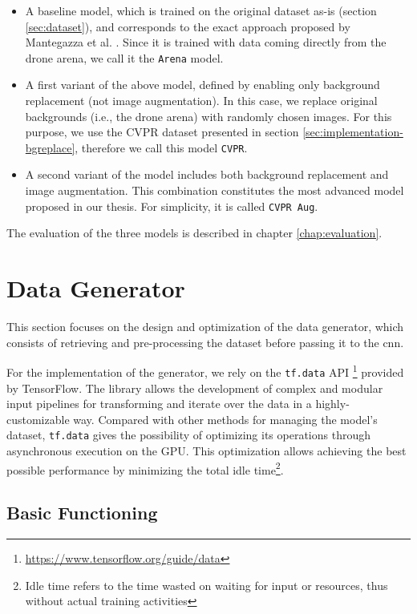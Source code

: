 \begin{itemize}
    \item A baseline model, which is trained on the original dataset as-is (section \ref{sec:dataset}), and corresponds to the exact approach proposed by Mantegazza et al. \cite{mantegazza2019visionbased}. Since it is trained with data coming directly from the drone arena, we call it the \texttt{Arena} model.
    \item A first variant of the above model, defined by enabling only background replacement (not image augmentation). In this case, we replace original backgrounds (i.e., the drone arena) with randomly chosen images. For this purpose, we use the CVPR dataset presented in section \ref{sec:implementation-bgreplace}, therefore we call this model \texttt{CVPR}.
    \item A second variant of the model includes both background replacement and image augmentation. This combination constitutes the most advanced model proposed in our thesis. For simplicity, it is called \texttt{CVPR Aug}.
\end{itemize}

The evaluation of the three models is described in chapter \ref{chap:evaluation}.




\section{Data Generator}
\label{sec:data-generator}

This section focuses on the design and optimization of the data generator, which consists of retrieving and pre-processing the dataset before passing it to the \gls{cnn}.

For the implementation of the generator, we rely on the \texttt{tf.data} API \footnote{\url{https://www.tensorflow.org/guide/data}} provided by TensorFlow. The library allows the development of complex and modular input pipelines for transforming and iterate over the data in a highly-customizable way. Compared with other methods for managing the model's dataset, \texttt{tf.data} gives the possibility of optimizing its operations through asynchronous execution on the GPU. This optimization allows achieving the best possible performance by minimizing the total idle time\footnote{Idle time refers to the time wasted on waiting for input or resources, thus without actual training activities}.



\subsection{Basic Functioning}
\label{subsec:data-generator-basic}

